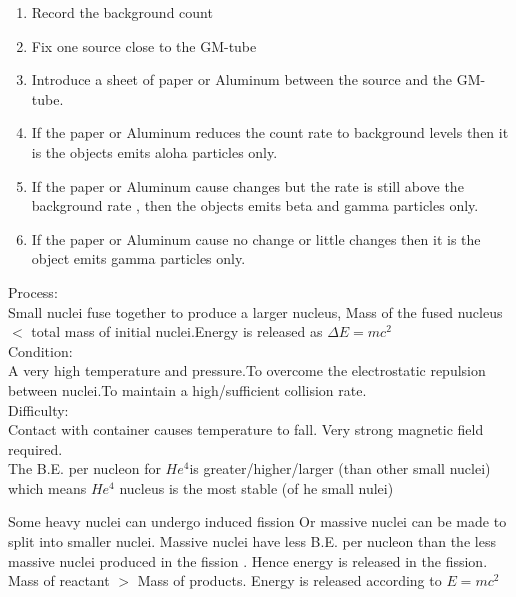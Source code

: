 \documentclass[a4paper]{article}
\begin{document}
\begin{defi}
\begin{enumerate}
    \item Record the background count
    \item Fix one source close to the GM-tube
    \item Introduce a sheet of paper or Aluminum between the source and the GM-tube.
    \item If the paper or Aluminum reduces the count rate to background levels then it is the objects emits aloha particles only.
    \item If the paper or Aluminum cause changes but the rate is still above the background rate , then the objects emits beta and gamma particles only.
    \item If the paper or Aluminum cause no change or little changes then it is the object emits gamma particles only.
\end{enumerate}
\end{defi}

\begin{defi}[Fusion]
Process:\\
Small nuclei fuse together to produce a larger nucleus, Mass of the fused nucleus $<$ total mass of initial nuclei.Energy is released as $\Delta E =mc^2$\\
Condition:\\
A very high temperature and pressure.To overcome the electrostatic repulsion between nuclei.To maintain a high/sufficient collision rate.\\
Difficulty:\\
Contact with container causes temperature to fall. Very strong magnetic field required.\\

The B.E. per nucleon for $He^4$is greater/higher/larger (than other small nuclei) which means $He^4$ nucleus is the most stable (of he small nulei)
\end{defi}
\begin{defi}[Fission]
Some heavy nuclei can undergo induced fission Or massive nuclei can be made to split into smaller nuclei. Massive nuclei have less B.E. per nucleon than the less massive nuclei produced in the fission . Hence energy is released in the fission. Mass of reactant $>$ Mass of products. Energy is released according to $E=mc^2$
\end{defi}
\end{document}
